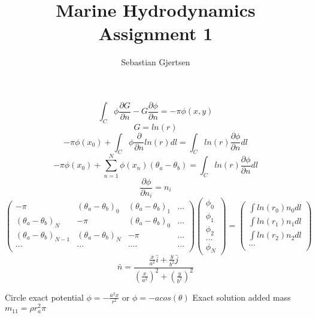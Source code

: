 \documentclass[a4paper,norsk]{article}
\begin{document}
\title{Marine Hydrodynamics \\ Assignment 1}
\author{Sebastian Gjertsen}

\maketitle
\[   \int_C \phi \frac{\partial G }{\partial n} - G\frac{\partial \phi }{\partial n} = -\pi \phi(x,y) \]
\newline
$$ G = ln (r)$$
\newline
$$ -\pi \phi(x_0) + \int_C \phi \frac{\partial }{\partial n} ln(r) dl = \int_C ln(r) \frac{\partial \phi}{\partial n} dl       $$
\newline
\[ -\pi \phi(x_0) + \sum_{n=1}^N \phi(x_n) (\theta_a - \theta_b)  = \int_C ln(r)\frac{\partial \phi }{\partial n} dl    \]
\newline
$$\frac{\partial \phi}{\partial n_i} =n_i $$
\newline
$$
\begin{pmatrix}
  -\pi & (\theta_a - \theta_b)_0  & (\theta_a - \theta_b)_1 & ...\\
  (\theta_a - \theta_b)_N  & -\pi & (\theta_a - \theta_b)_0  & ...\\
  (\theta_a - \theta_b)_{N-1}  & (\theta_a - \theta_b)_N  & -\pi & ...\\
  ... & ... & ....& ...  \\
 \end{pmatrix}
 \begin{pmatrix}
\phi_0  \\
\phi_1 \\
\phi_2 \\ 
  ...  \\
  \phi_N
 \end{pmatrix}
 =
 \begin{pmatrix}
\int ln(r_0) n_0 dl   \\
\int ln(r_1) n_1 dl  \\
\int ln(r_2) n_2 dl  \\ 
  ...  \\
  \end{pmatrix}
  $$
\newline
$$\bar{n} = \frac{\frac{x}{a^2}\bar{i} + \frac{y}{b^2}\bar{j} } { (\frac{x}{a^2})^2 + (\frac{y}{b^2})^2 }$$

\begin{flushleft}
Circle exact potential $\phi =-\frac{a^2x}{r^2} $ or $\phi = -a cos(\theta)$ 
\newline
\newline
Exact solution added mass $m_{11} = \rho r_a^2 \pi $
\end{flushleft}
\end{document}
